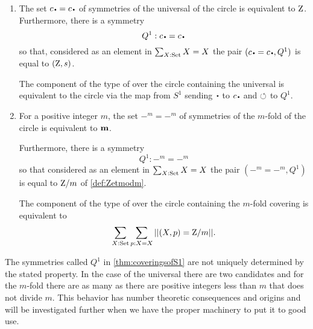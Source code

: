 \begin{theorem}
  \label{thm:coveringsofS1}
  \begin{enumerate}
  \item 
  The set $c_\base=c_\base$ of symmetries of the universal \covering of the circle is equivalent to $\mathrm{Z}$.  
Furthermore, there is a symmetry $$Q^1:c_\base=c_\base$$ so that, considered as an element in $\sum_{X:\mathord{\mathrm{Set}}}X=X$ the pair $(c_\base=c_\base,Q^1)$ is equal to $(\mathrm{Z},s)$.  

The component of the type of \coverings over the circle containing the universal \covering is equivalent to the circle via the map from $S^1$ sending $\base$ to $c_\base$ and $\circlearrowleft$ to $Q^1$.
\item For a positive integer $m$, the set $-^m=-^m$ of symmetries of the $m$-fold \covering of the circle is equivalent to $\mathbf{m}$.  

Furthermore, there is a symmetry $$Q^1:-^m=-^m$$ so that considered as an element in $\sum_{X:\mathord{\mathrm{Set}}}X=X$ the pair $(-^m=-^m,Q^1)$ is equal to $\mathrm{Z}/m$ of \cref{def:Zetmodm}.

The component of the type of \coverings over the circle containing the $m$-fold covering is equivalent to $$\sum_{X:\mathord{\mathrm{Set}}}\sum_{p:X=X}||(X,p)=\mathrm{Z}/m||.$$
  \end{enumerate}

 \end{theorem}
\begin{remark}\label{rem:thenonuniquenessofgeneratorsofmodulararithmetic1}
  The symmetries called $Q^1$ in \cref{thm:coveringsofS1} are not uniquely determined by the stated property.  
In the case of the universal \covering there are two candidates and for the $m$-fold \covering there are as many as there are positive integers less than $m$ that does not divide $m$.  
This behavior has number theoretic consequences and origins and will be investigated further when we have the proper machinery to put it to good use.
\end{remark}

